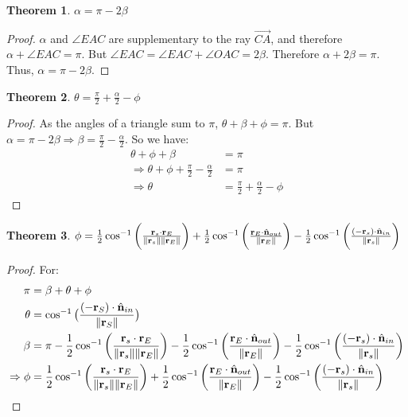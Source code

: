 \documentclass{article}
\theoremstyle{mystyle}
\newtheorem{theorem}{Theorem}[section]
\begin{document}
\begin{theorem}
$\alpha = \pi - 2\beta$
\end{theorem}
\begin{proof}
$\alpha$ and $\angle EAC$ are supplementary to the ray $\overrightarrow{CA}$, and therefore $\alpha + \angle EAC = \pi$. But $\angle EAC = \angle EAC + \angle OAC = 2\beta$. Therefore $\alpha + 2\beta = \pi$. Thus, $\alpha = \pi - 2\beta$.
\end{proof}

\begin{theorem}
$\theta = \frac{\pi}{2}+ \frac{\alpha}{2}-\phi$
\end{theorem}
\begin{proof}
As the angles of a triangle sum to $\pi$, $\theta+\beta+\phi = \pi$. But $\alpha = \pi - 2\beta \Rightarrow \beta = \frac{\pi}{2}-\frac{\alpha}{2}$. So we have:
\begin{align}
    \theta+\phi+\beta &=\pi \\
    \Rightarrow \theta+\phi+\frac{\pi}{2}-\frac{\alpha}{2} &= \pi\\
    \Rightarrow \theta &= \frac{\pi}{2} +\frac{\alpha}{2}-\phi
\end{align}
\end{proof}

\begin{theorem}
$\phi = \frac{1}{2}\cos^{-1}\bigg(\frac{\mathbf{r}_{s}\cdot \mathbf{r}_{E}}{\norm{\mathbf{r}_{s}}\norm{\mathbf{r}_{E}}}\bigg) + \frac{1}{2}\cos^{-1}\bigg(\frac{\mathbf{r}_{E}\cdot \hat{\mathbf{n}}_{out}}{\norm{\mathbf{r}_{E}}}\bigg) - \frac{1}{2}\cos^{-1}\bigg(\frac{(-\mathbf{r}_{s})\cdot \hat{\mathbf{n}}_{in}}{\norm{\mathbf{r}_{s}}}\bigg) $
\end{theorem}
\begin{proof}
For:
\begin{align}
    \pi &=\beta+\theta+\phi\\
    \theta &= \cos^{-1}\big(\frac{(-\mathbf{r}_{S})\cdot\hat{\mathbf{n}}_{in}}{\norm{\mathbf{r}_{S}}}\big)\\
    \beta &= \pi-\frac{1}{2}\cos^{-1}\bigg(\frac{\mathbf{r}_{s}\cdot \mathbf{r}_{E}}{\norm{\mathbf{r}_{s}}\norm{\mathbf{r}_{E}}}\bigg) - \frac{1}{2}\cos^{-1}\bigg(\frac{\mathbf{r}_{E}\cdot \hat{\mathbf{n}}_{out}}{\norm{\mathbf{r}_{E}}}\bigg) - \frac{1}{2}\cos^{-1}\bigg(\frac{(-\mathbf{r}_{s})\cdot \hat{\mathbf{n}}_{in}}{\norm{\mathbf{r}_{s}}}\bigg)\\
    \Rightarrow \phi & = \frac{1}{2}\cos^{-1}\bigg(\frac{\mathbf{r}_{s}\cdot \mathbf{r}_{E}}{\norm{\mathbf{r}_{s}}\norm{\mathbf{r}_{E}}}\bigg) + \frac{1}{2}\cos^{-1}\bigg(\frac{\mathbf{r}_{E}\cdot \hat{\mathbf{n}}_{out}}{\norm{\mathbf{r}_{E}}}\bigg) - \frac{1}{2}\cos^{-1}\bigg(\frac{(-\mathbf{r}_{s})\cdot \hat{\mathbf{n}}_{in}}{\norm{\mathbf{r}_{s}}}\bigg)
\end{align}
\end{proof}
\end{document}

